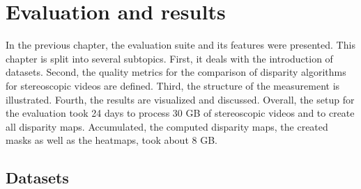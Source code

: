 \chapter{Evaluation and results}
\label{chap:eval}

In the previous chapter, the evaluation suite and its features were presented.
This chapter is split into several subtopics.
First, it deals with the introduction of datasets.
Second, the quality metrics for the comparison of disparity algorithms  for stereoscopic videos are defined.
Third, the structure of the measurement is illustrated.
Fourth, the results are visualized and discussed.
\newline\newline\noindent Overall, the setup for the evaluation took 24 days to process 30 GB of stereoscopic videos and to create all disparity maps.
Accumulated, the computed disparity maps, the created masks as well as the heatmaps, took about 8 GB.

\section{Datasets}

